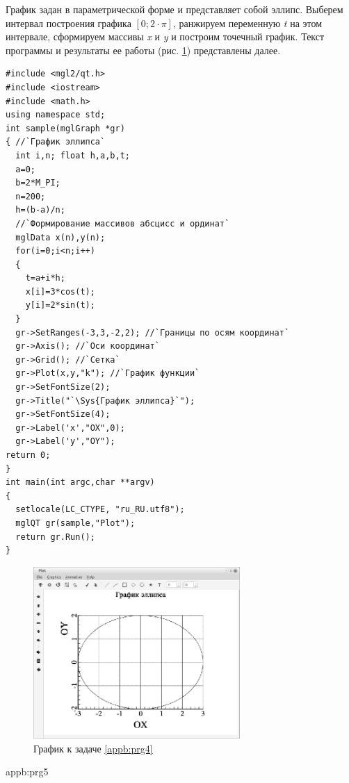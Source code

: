 
График задан в параметрической форме и представляет собой эллипс. Выберем интервал построения графика  $[0;2\cdot \pi
]$, ранжируем переменную \emph{t} на этом интервале, сформируем массивы \emph{x} и
\emph{y} и построим точечный график. Текст программы и результаты ее работы (рис. \ref{appb:refDrawing5})
представлены далее.
\begin{lstlisting}
#include <mgl2/qt.h>
#include <iostream>
#include <math.h>
using namespace std;
int sample(mglGraph *gr)
{ //`График эллипса`
  int i,n; float h,a,b,t;
  a=0;
  b=2*M_PI;
  n=200;
  h=(b-a)/n;
  //`Формирование массивов абсцисс и ординат`
  mglData x(n),y(n);
  for(i=0;i<n;i++)
  {
    t=a+i*h;
    x[i]=3*cos(t);
    y[i]=2*sin(t);
  }
  gr->SetRanges(-3,3,-2,2); //`Границы по осям координат`
  gr->Axis(); //`Оси координат`
  gr->Grid(); //`Сетка`
  gr->Plot(x,y,"k"); //`График функции`
  gr->SetFontSize(2);
  gr->Title("`\Sys{График эллипса}`");
  gr->SetFontSize(4);
  gr->Label('x',"OX",0);
  gr->Label('y',"OY");
return 0;
}
int main(int argc,char **argv)
{
  setlocale(LC_CTYPE, "ru_RU.utf8");
  mglQT gr(sample,"Plot");
  return gr.Run();
}
\end{lstlisting}

\begin{figure}[htb]
\begin{center}
\includegraphics[width=0.7\textwidth]{img/ris_appb_6}
\caption{График к задаче \ref{appb:prg4}}
\label{appb:refDrawing5}
\end{center}
\end{figure}

{appb:prg5}

